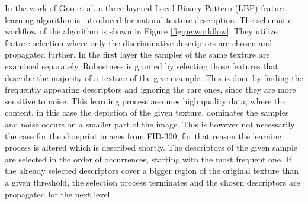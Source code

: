 \documentclass[draft,final]{vutinfth} %
\begin{document}
\par
In the work of Guo et al. \cite{guo2012discriminative} a three-layered Local Binary Pattern (LBP) feature learning algorithm is introduced for natural texture description.
The schematic workflow of the algorithm is shown in Figure \ref{fig:pe:workflow}.
They utilize feature selection where only the discriminative descriptors are chosen and propagated further.
In the first layer the samples of the same texture are examined separately.
Robustness is granted by selecting those features that describe the majority of a texture of the given sample.
This is done by finding the frequently appearing descriptors and ignoring the rare ones, since they are more sensitive to noise.
This learning process assumes high quality data, where the content, in this case the depiction of the given texture, dominates the samples and noise occurs on a smaller part of the image.
This is however not necessarily the case for the shoeprint images from FID-300, for that reason the learning process is altered which is described shortly.
The descriptors of the given sample are selected in the order of occurrences, starting with the most frequent one.
If the already selected descriptors cover a bigger region of the original texture than a given threshold, the selection process terminates and the chosen descriptors are propagated for the next level.
\end{document}
